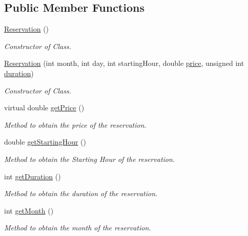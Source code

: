 \subsection*{Public Member Functions}
\begin{DoxyCompactItemize}
\item 
\mbox{\hyperlink{class_reservation_a63b283053695e6f50fa44c50da2b3de5}{Reservation}} ()
\begin{DoxyCompactList}\small\item\em Constructor of Class. \end{DoxyCompactList}\item 
\mbox{\hyperlink{class_reservation_ac060bb57009704f7cfe33bed498b72d0}{Reservation}} (int month, int day, int starting\+Hour, double \mbox{\hyperlink{class_reservation_a82e197bd30e7949ee9b8616ee4eacf83}{price}}, unsigned int \mbox{\hyperlink{class_reservation_a1a311bb23edebfa226f9c744aefdc7b1}{duration}})
\begin{DoxyCompactList}\small\item\em Constructor of Class. \end{DoxyCompactList}\item 
virtual double \mbox{\hyperlink{class_reservation_a62cdb2f1a24e2fce92fb9f024ae9f494}{get\+Price}} ()
\begin{DoxyCompactList}\small\item\em Method to obtain the price of the reservation. \end{DoxyCompactList}\item 
double \mbox{\hyperlink{class_reservation_a28da7b16dadfeb33bf5351cabc8dbb0b}{get\+Starting\+Hour}} ()
\begin{DoxyCompactList}\small\item\em Method to obtain the Starting Hour of the reservation. \end{DoxyCompactList}\item 
int \mbox{\hyperlink{class_reservation_a9d91ef1230af46952cb5422ae769bfa1}{get\+Duration}} ()
\begin{DoxyCompactList}\small\item\em Method to obtain the duration of the reservation. \end{DoxyCompactList}\item 
int \mbox{\hyperlink{class_reservation_adbc454654e7e861d80c8740f85e0fb10}{get\+Month}} ()
\begin{DoxyCompactList}\small\item\em Method to obtain the month of the reservation. \end{DoxyCompactList}\item 

\end{DoxyCompactItemize}
